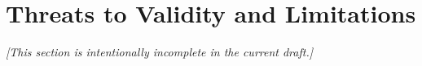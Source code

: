 \section{Threats to Validity and Limitations}
\label{sec:threats}
\textit{[This section is intentionally incomplete in the current draft.]}
